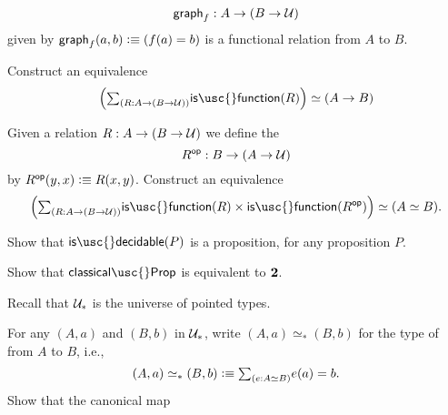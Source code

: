 \begin{exercises}
\begin{subexenum}
\begin{equation*}
\mathsf{graph}_f:A\to (B\to \mathcal{U})
\end{equation*}
given by $\mathsf{graph}_f(a,b)\vcentcolon\equiv (f(a)=b)$ is a functional relation from $A$ to $B$.
\item Construct an equivalence
\begin{equation*}
\eqv{\Big(\sm{R:A\to (B\to\UU)}\mathsf{is\usc{}function}(R)\Big)}{(A\to B)}
\end{equation*}
\item Given a relation $R:A\to (B\to \mathcal{U})$ we define the 
\begin{equation*}
R^{\mathsf{op}} : B\to (A\to\mathcal{U})
\end{equation*}
by $R^{\mathsf{op}}(y,x)\vcentcolon\equiv R(x,y)$. Construct an equivalence
\begin{equation*}
\eqv{\Big(\sm{R:A\to (B\to \UU)}\mathsf{is\usc{}function}(R)\times\mathsf{is\usc{}function}(R^{\mathsf{op}})\Big)}{(\eqv{A}{B})}.
\end{equation*}
\end{subexenum}
\item
  \begin{subexenum}
  \item Show that $\mathsf{is\usc{}decidable}(P)$ is a proposition, for any proposition $P$.
  \item Show that $\mathsf{classical\usc{}Prop}$%
     is equivalent to $\mathbf{2}$.
  \end{subexenum}
\item Recall that $\mathcal{U}_\ast$ is the universe of pointed types.
  \begin{subexenum}
  \item For any $(A,a)$ and $(B,b)$ in $\mathcal{U}_\ast$, write $(A,a)\simeq_\ast(B,b)$ for the type of  from $A$ to $B$, i.e.,
    \begin{equation*}
      (A,a)\simeq_\ast (B,b)\defeq \sm{e:A\simeq B}e(a)=b.
    \end{equation*}
    Show that the canonical map
    \begin{equation*}

\end{equation*}
\end{subexenum}
\end{exercises}
